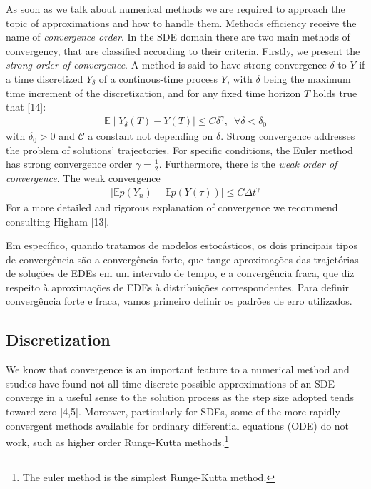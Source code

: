 \documentclass[12pt,twoside]{reedthesis}
\theoremstyle{definition}
\theoremstyle{definition}
\theoremstyle{remark}
\begin{document}
  As soon as we talk about numerical methods we are required to approach
  the topic of approximations and how to handle them. Methods efficiency
  receive the name of \emph{convergence order}. In the SDE domain there
  are two main methods of convergency, that are classified according to
  their criteria. Firstly, we present the \emph{strong order of
  convergence}. A method is said to have strong convergence \(\delta\) to
  \(Y\) if a time discretized \(Y_{\delta}\) of a continous-time process
  \(Y\), with \(\delta\) being the maximum time increment of the
  discretization, and for any fixed time horizon \(T\) holds true that
  {[}14{]}:
  \begin{align*}
  \mathbb{E} \mid Y_{\delta}(T) - Y(T) \mid \leq C \delta^{\gamma}, \,\,\, \forall \delta < \delta_0
  \end{align*}
  with \(\delta_0 > 0\) and \(\mathcal{C}\) a constant not depending on
  \(\delta\). Strong convergence addresses the problem of solutions'
  trajectories. For specific conditions, the Euler method has strong
  convergence order \(\gamma = \frac{1}{2}\). Furthermore, there is the
  \emph{weak order of convergence}. The weak convergence
  \begin{align*}
  \mid  \mathbb{E}p(Y_n) - \mathbb{E}p(Y(\tau)) \mid \leq C \Delta t^{\gamma}
  \end{align*}
  For a more detailed and rigorous explanation of convergence we recommend
  consulting Higham {[}13{]}.
  
  Em específico, quando tratamos de modelos estocásticos, os dois
  principais tipos de convergência são a convergência forte, que tange
  aproximações das trajetórias de soluções de EDEs em um intervalo de
  tempo, e a convergência fraca, que diz respeito à aproximações de EDEs à
  distribuições correspondentes. Para definir convergência forte e fraca,
  vamos primeiro definir os padrões de erro utilizados.
  
  \subsection{Discretization}\label{discretization}
  
  We know that convergence is an important feature to a numerical method
  and studies have found not all time discrete possible approximations of
  an SDE converge in a useful sense to the solution process as the step
  size adopted tends toward zero {[}4,5{]}. Moreover, particularly for
  SDEs, some of the more rapidly convergent methods available for ordinary
  differential equations (ODE) do not work, such as higher order
  Runge-Kutta methods.\footnote{The euler method is the simplest
    Runge-Kutta method.}
  
\end{document}
